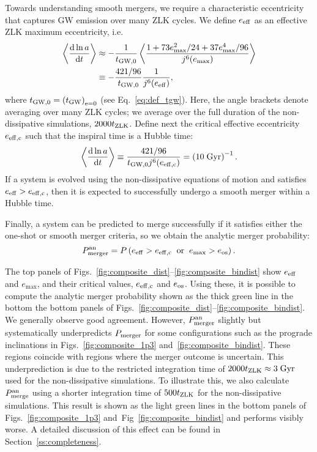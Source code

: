 \documentclass[
        fleqn,
        usenatbib,
    ]{mnras}
\newcommand*{\rd}[2]{\frac{\mathrm{d}#1}{\mathrm{d}#2}}
\newcommand*{\ev}[1]{\left\langle#1\right\rangle}
\newcommand*{\p}[1]{\left(#1\right)}
\begin{document}
Towards understanding smooth mergers, we require a characteristic eccentricity
that captures GW emission over many ZLK cycles. We define $e_{\rm eff}$ as an
effective ZLK maximum eccentricity, i.e.
\begin{align}
    \ev{\rd{\ln a}{t}} &\approx -\frac{1}{t_{\rm GW, 0}}
            \ev{\frac{1 + 73e_{\max}^2/24 + 37e_{\max}^4/96}
                {j^6(e_{\max})}}\nonumber\\
        &\equiv -\frac{421/96}{t_{\rm GW, 0}}\frac{1}{j^6(e_{\rm eff})},
        \label{eq:def_e_eff}
\end{align}
where $t_{\rm GW, 0} = \p{t_{\rm GW}}_{\rm e = 0}$ (see Eq.~\ref{eq:def_tgw}).
Here, the angle brackets denote averaging over many ZLK cycles; we average over
the full duration of the non-dissipative simulations, $2000 t_{\rm ZLK}$. Define
next the critical effective eccentricity $e_{\rm eff, c}$ such that the inspiral
time is a Hubble time:
\begin{equation}
    \ev{\rd{\ln a}{t}} \equiv \frac{421/96}{t_{\rm GW, 0}j^6(e_{\rm eff, c})}
        = \p{10\;\mathrm{Gyr}}^{-1}. \label{eq:def_e_eff_c}
\end{equation}
If a system is evolved using the non-dissipative equations of motion and
satisfies $e_{\rm eff} > e_{\rm eff, c}$, then it is expected to successfully
undergo a smooth merger within a Hubble time.

Finally, a system can be predicted to merge successfully if it satisfies either
the one-shot or smooth merger criteria, so we obtain the analytic merger
probability:
\begin{equation}
    P_{\rm merger}^{\rm an} = P\p{e_{\rm eff} > e_{\rm eff, c} \;\;\text{or}\;\;
        e_{\max} > e_{\rm os}}.\label{eq:def_pmerge_sa}
\end{equation}

The top panels of Figs.~\ref{fig:composite_dist}--\ref{fig:composite_bindist}
show $e_{\rm eff}$ and $e_{\max}$, and their critical values, $e_{\rm eff, c}$
and $e_{\rm os}$. Using these, it is possible to compute the analytic merger
probability shown as the thick green line in the bottom the bottom panels of
Figs.~\ref{fig:composite_dist}--\ref{fig:composite_bindist}. We generally
observe good agreement. However, $P_{\rm merger}^{\rm an}$ slightly but
systematically underpredicts $P_{\rm merger}$ for some configurations such as
the prograde inclinations in Figs.~\ref{fig:composite_1p3}
and~\ref{fig:composite_bindist}. These regions coincide with regions where the
merger outcome is uncertain. This underprediction is due to the restricted
integration time of $2000 t_{\rm ZLK} \approx 3\;\mathrm{Gyr}$ used for the
non-dissipative simulations. To illustrate this, we also calculate $P_{\rm
merge}^{\rm an}$ using a shorter integration time of $500 t_{\rm ZLK}$ for the
non-dissipative simulations. This result is shown as the light green lines in
the bottom panels of Figs.~\ref{fig:composite_1p3}
and~Fig~\ref{fig:composite_bindist} and performs visibly worse. A detailed
discussion of this effect can be found in Section~\ref{ss:completeness}.
\end{document}
